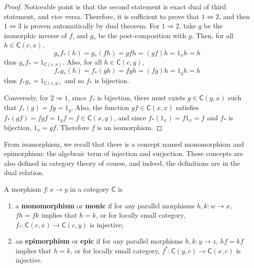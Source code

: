 \begin{proof} Noticeable point is that the second statement is exact dual of third statement, and vice versa. Therefore, it is sufficient to prove that $1\Leftrightarrow 2$, and then $1\Leftrightarrow 3$ is proven automatically by dual theorem.
For $1\Rightarrow 2$, take $g$ be the isomorphic inverse of $f$, and $g_*$ be the post-composition with $g$. Then, for all $h\in \mathsf{C}(c,x)$,
\begin{equation}
g_* f_*(h)=g_*(fh)=gfh=(gf)h=1_x h=h
\end{equation}
thus $g_* f_*=1_{\mathsf{C}(c,x)}$. Also, for all $h\in \mathsf{C}(c,y)$,
\begin{equation}
f_* g_*(h)=f_*(gh)=fgh=(fg)h=1_y h=h
\end{equation}
thus $f_* g_*=1_{\mathsf{C}(c,y)}$ and so $f_*$ is bijection.

Conversely, for $2\Rightarrow 1$, since $f_*$ is bijection, there must exists $g\in \mathsf{C}(y,x)$ such that $f_*(g)=fg=1_y$. Also, the function $gf\in \mathsf{C}(x,x)$ satisfies $f_*(gf)=fgf=1_yf=f\in \mathsf{C}(x,y)$, and since $f_*(1_x)=f 1_x=f$ and $f_*$ is bijection, $1_x=gf$. Therefore $f$ is an isomorphism.
\end{proof}

From isomorphism, we recall that there is a concept named monomorphism and epimorphism: the algebraic term of injection and surjection. These concepts are also defined in category theory of course, and indeed, the definitions are in the dual relation.
\begin{defn} A morphism $f:x\rightarrow y$ in a category $\mathsf{C}$ is
\begin{enumerate}
\item a \textbf{monomorphism} or \textbf{monic} if for any parallel morphisms $h,k:w\rightarrow x$, $fh=fk$ implies that $h=k$, or for locally small category, $f_*:\mathsf{C}(c,x)\rightarrow \mathsf{C}(c,y)$ is injective;
\item {}an \textbf{epimorphism} or \textbf{epic} if for any parallel morphisms $h,k:y\rightarrow z$, $hf=kf$ implies that $h=k$, or for locally small category, $f^*:\mathsf{C}(y,c)\rightarrow \mathsf{C}(x,c)$ is injective.
\end{enumerate}
\end{defn}


